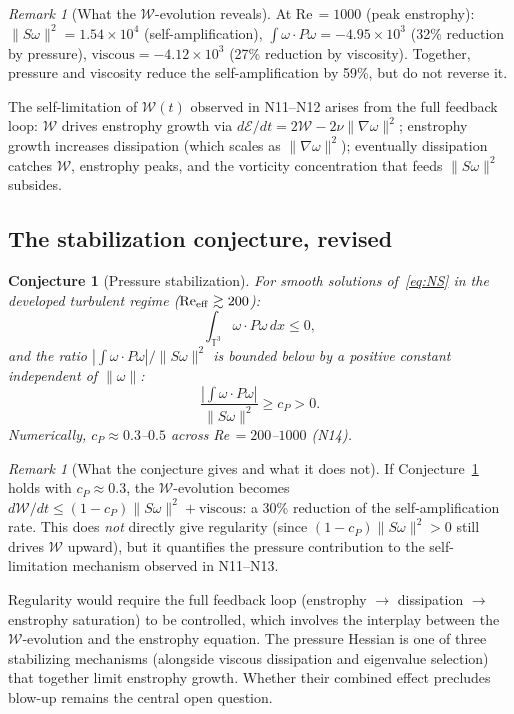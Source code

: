 \documentclass[11pt,a4paper]{article}
\theoremstyle{plain}
\newtheorem{conjecture}[theorem]{Conjecture}
\theoremstyle{definition}
\theoremstyle{remark}
\newtheorem{remark}[theorem]{Remark}
\newcommand{\T}{\mathbb{T}}
\begin{document}
\begin{remark}[What the $\mathcal{W}$-evolution
reveals]
\label{rem:W-evol-meaning}
At Re$\,=1000$ (peak enstrophy):
$\|S\omega\|^2 = 1.54\times 10^4$ (self-amplification),
$\int\omega\cdot P\omega = -4.95\times 10^3$
(32\% reduction by pressure),
$\text{viscous} = -4.12\times 10^3$
(27\% reduction by viscosity).
Together, pressure and viscosity reduce the
self-amplification by 59\%, but do not reverse it.

The self-limitation of $\mathcal{W}(t)$ observed in
N11--N12 arises from the full feedback loop:
$\mathcal{W}$ drives enstrophy growth via
$d\mathcal{E}/dt = 2\mathcal{W}
-2\nu\|\nabla\omega\|^2$; enstrophy growth
increases dissipation (which scales as
$\|\nabla\omega\|^2$); eventually dissipation
catches $\mathcal{W}$, enstrophy peaks, and the
vorticity concentration that feeds $\|S\omega\|^2$
subsides.
\end{remark}

\subsection{The stabilization conjecture, revised}

\begin{conjecture}[Pressure stabilization]
\label{conj:pressure}
For smooth solutions of~\eqref{eq:NS} in the
developed turbulent regime
($\mathrm{Re}_{\rm eff}\gtrsim 200$):
\begin{equation}\label{eq:P-conj}
\int_{\T^3}\omega\cdot P\omega\,dx \leq 0,
\end{equation}
and the ratio $|\int\omega\cdot P\omega|
/\|S\omega\|^2$ is bounded below by a positive
constant independent of $\|\omega\|$:
\begin{equation}\label{eq:P-conj-ratio}
\frac{|\int\omega\cdot P\omega|}{\|S\omega\|^2}
\geq c_P > 0.
\end{equation}
Numerically, $c_P\approx 0.3$--$0.5$ across
Re$\,=200$--$1000$ (N14).
\end{conjecture}

\begin{remark}[What the conjecture gives and
what it does not]
\label{rem:conj-consequence}
If Conjecture~\ref{conj:pressure} holds with
$c_P\approx 0.3$, the $\mathcal{W}$-evolution
becomes
$d\mathcal{W}/dt \leq (1-c_P)\|S\omega\|^2
+ \text{viscous}$:
a 30\% reduction of the self-amplification rate.
This does \emph{not} directly give regularity
(since $(1-c_P)\|S\omega\|^2>0$ still drives
$\mathcal{W}$ upward), but it quantifies the
pressure contribution to the self-limitation
mechanism observed in N11--N13.

Regularity would require the full feedback loop
(enstrophy $\to$ dissipation $\to$ enstrophy
saturation) to be controlled, which involves
the interplay between the $\mathcal{W}$-evolution
and the enstrophy equation.  The pressure Hessian
is one of three stabilizing mechanisms
(alongside viscous dissipation and eigenvalue
selection) that together limit enstrophy growth.
Whether their combined effect precludes blow-up
remains the central open question.
\end{remark}
\end{document}

